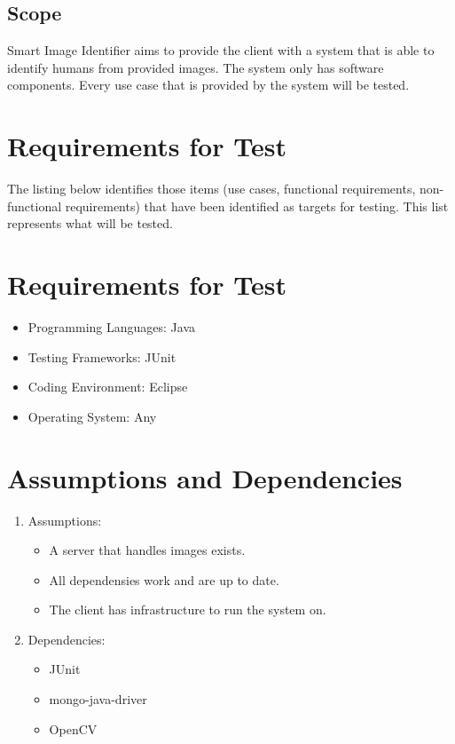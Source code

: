 \documentclass[a4paper,12pt]{report}
\begin{document}
	\subsection {Scope}
		Smart Image Identifier aims to provide the client with a system that is able to identify humans from provided images. The system only has software components.
		Every use case that is provided by the system will be tested.
		
\section {Requirements for Test}
	The listing below identifies those items (use cases, functional requirements, non-functional requirements) that have been identified as targets for testing. 
	This list represents what will be tested.

\section {Requirements for Test}
	\begin {itemize}
		\item Programming Languages: Java
		\item Testing Frameworks: JUnit
		\item Coding Environment: Eclipse
		\item Operating System: Any
	\end {itemize}

\section {Assumptions and Dependencies}	
	\begin {enumerate}
		\item Assumptions:
			\begin {itemize}
				\item A server that handles images exists.
				\item All dependensies work and are up to date.
				\item The client has infrastructure to run the system on.
			\end {itemize}

		\item Dependencies:
		\begin {itemize}
			\item JUnit
			\item mongo-java-driver
			\item OpenCV
		\end {itemize}
	\end {enumerate}
\end{document}
